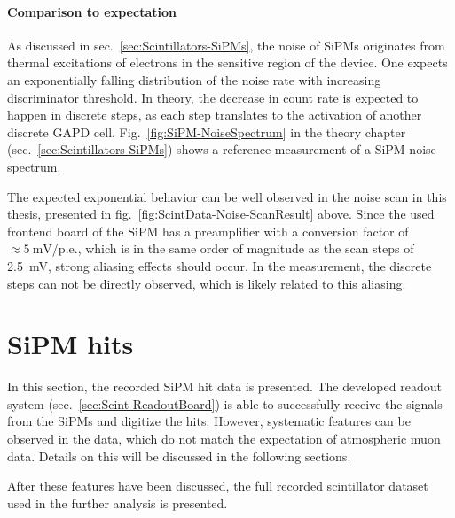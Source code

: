 \paragraph{Comparison to expectation}
As discussed in sec.\ \ref{sec:Scintillators-SiPMs}, the noise of \acp{SiPM} originates from thermal excitations of electrons in the sensitive region of the device.
One expects an exponentially falling distribution of the noise rate with increasing discriminator threshold. In theory, the decrease in count rate is expected to happen in discrete steps, as each step translates to the activation of another discrete \ac{GAPD} cell. Fig.\ \ref{fig:SiPM-NoiseSpectrum} in the theory chapter (sec.\ \ref{sec:Scintillators-SiPMs}) shows a reference measurement of a \ac{SiPM} noise spectrum.
\par The expected exponential behavior can be well observed in the noise scan in this thesis, presented in fig.\ \ref{fig:ScintData-Noise-ScanResult} above. Since the used frontend board of the \ac{SiPM} has a preamplifier with a conversion factor of $\approx \SI{5}{\milli\volt}$/\ac{p.e.}, which is in the same order of magnitude as the scan steps of \SI{2.5}{\milli\volt}, strong aliasing effects should occur. In the measurement, the discrete steps can not be directly observed, which is likely related to this aliasing.







\FloatBarrier
\section{SiPM hits}
\label{sec:ScintData-Hits}
In this section, the recorded \ac{SiPM} hit data is presented. The developed readout system (sec.\ \ref{sec:Scint-ReadoutBoard}) is able to successfully receive the signals from the \acp{SiPM} and digitize the hits. However, systematic features can be observed in the data, which do not match the expectation of atmospheric muon data. Details on this will be discussed in the following sections.
\par After these features have been discussed, the full recorded scintillator dataset used in the further analysis is presented.

